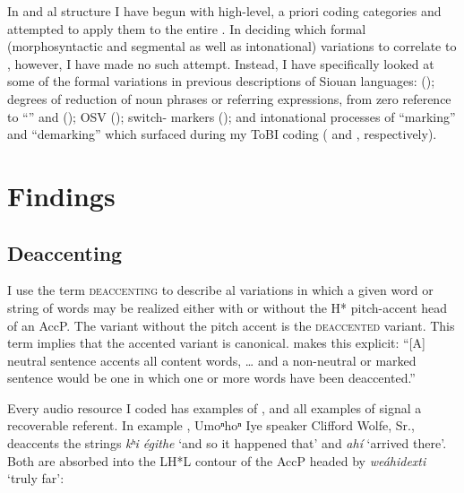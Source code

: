 \documentclass[output=paper]{LSP/langsci}
\begin{document}
In  and al structure I have begun with high-level, a priori coding categories and attempted to apply them to the entire . In deciding which formal (morphosyntactic and segmental as well as intonational) variations to correlate to , however, I have made no such attempt. Instead, I have specifically looked at some of the formal variations in previous descriptions of Siouan languages:  (); degrees of reduction of noun phrases or referring expressions, from zero reference to “” and  (); OSV  (); switch- markers (); and intonational processes of “marking” and “demarking” which surfaced during my ToBI coding ( and , respectively).

\section{Findings}\label{findings}

\subsection{Deaccenting}\label{deaccenting}

	I use the term \textsc{deaccenting} to describe al variations in which a given word or string of words may be realized either with or without the H* pitch-accent head of an AccP. The variant without the pitch accent is the \textsc{deaccented} variant. This term implies that the accented variant is canonical. \citet[100]{Bolinger1986} makes this explicit: “[A] neutral sentence accents all content words, … and a non-neutral or marked sentence would be one in which one or more words have been deaccented.”
	
Every audio resource I coded has examples of , and all examples of  signal a recoverable referent. In example , Umoⁿhoⁿ Iye speaker Clifford Wolfe, Sr., deaccents the strings \textit{kʰi égithe} `and so it happened that' and \textit{ahí} `arrived there'. Both are absorbed into the LH*L contour of the AccP headed by \textit{weáhidexti} `truly far':

\renewcommand{\exfont}{\itshape}
\let\eachwordone=\itshape
\end{document}
